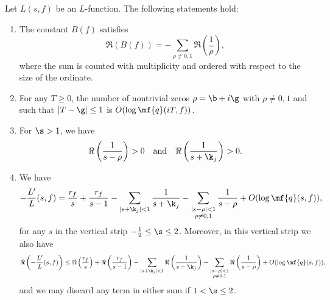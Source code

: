     \begin{lemma}\label{lem:powerful_L-function_approximation_lemma}
      Let $L(s,f)$ be an $L$-function. The following statements hold:
      \begin{enumerate}[label=(\roman*)]
        \item The constant $B(f)$ satisfies
        \[
          \Re(B(f)) = -\sum_{\rho \neq 0,1}\Re\left(\frac{1}{\rho}\right),
        \]
        where the sum is counted with multiplicity and ordered with respect to the size of the ordinate.
        \item For any $T \ge 0$, the number of nontrivial zeros $\rho = \b+i\g$ with $\rho \neq 0,1$ and such that $|T-\g| \le 1$ is $O(\log{\mf{q}(iT,f)})$.
        \item For $\s > 1$, we have
        \[
          \Re\left(\frac{1}{s-\rho}\right) > 0 \quad \text{and} \quad \Re\left(\frac{1}{s+\k_{j}}\right) > 0.
        \]
        \item We have
        \[
          -\frac{L'}{L}(s,f) = \frac{r_{f}}{s}+\frac{r_{f}}{s-1}-\sum_{|s+\k_{j}| < 1}\frac{1}{s+\k_{j}}-\sum_{\substack{|s-\rho| < 1 \\ \rho \neq 0,1}}\frac{1}{s-\rho}+O(\log{\mf{q}(s,f)}),
        \]
        for any $s$ in the vertical strip $-\frac{1}{2} \le \s \le 2$. Moreover, in this vertical strip we also have
        \[
          \Re\left(-\frac{L'}{L}(s,f)\right) \le \Re\left(\frac{r_{f}}{s}\right)+\Re\left(\frac{r_{f}}{s-1}\right)-\sum_{|s+\k_{j}| < 1}\Re\left(\frac{1}{s+\k_{j}}\right)-\sum_{\substack{|s-\rho| < 1 \\ \rho \neq 0,1}}\Re\left(\frac{1}{s-\rho}\right)+O(\log{\mf{q}(s,f)}),
        \]
        and we may discard any term in either sum if $1 < \s \le 2$.
      \end{enumerate}
    \end{lemma}
